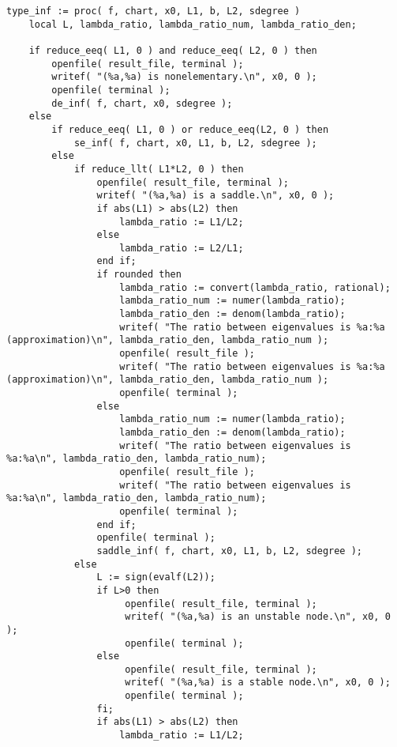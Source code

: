 \documentclass[a4paper,10pt]{article}
\begin{document}
\begin{lstlisting}[name=infinity]
type_inf := proc( f, chart, x0, L1, b, L2, sdegree )
    local L, lambda_ratio, lambda_ratio_num, lambda_ratio_den;

    if reduce_eeq( L1, 0 ) and reduce_eeq( L2, 0 ) then
        openfile( result_file, terminal );
        writef( "(%a,%a) is nonelementary.\n", x0, 0 );
        openfile( terminal );
        de_inf( f, chart, x0, sdegree );
    else
        if reduce_eeq( L1, 0 ) or reduce_eeq(L2, 0 ) then
            se_inf( f, chart, x0, L1, b, L2, sdegree );
        else
            if reduce_llt( L1*L2, 0 ) then
                openfile( result_file, terminal );
                writef( "(%a,%a) is a saddle.\n", x0, 0 );
                if abs(L1) > abs(L2) then
                    lambda_ratio := L1/L2;
                else
                    lambda_ratio := L2/L1;
                end if;
                if rounded then
                    lambda_ratio := convert(lambda_ratio, rational);
                    lambda_ratio_num := numer(lambda_ratio);
                    lambda_ratio_den := denom(lambda_ratio);
                    writef( "The ratio between eigenvalues is %a:%a (approximation)\n", lambda_ratio_den, lambda_ratio_num );
                    openfile( result_file );
                    writef( "The ratio between eigenvalues is %a:%a (approximation)\n", lambda_ratio_den, lambda_ratio_num );
                    openfile( terminal );
                else
                    lambda_ratio_num := numer(lambda_ratio);
                    lambda_ratio_den := denom(lambda_ratio);
                    writef( "The ratio between eigenvalues is %a:%a\n", lambda_ratio_den, lambda_ratio_num);
                    openfile( result_file );
                    writef( "The ratio between eigenvalues is %a:%a\n", lambda_ratio_den, lambda_ratio_num);
                    openfile( terminal );
                end if;
                openfile( terminal );
                saddle_inf( f, chart, x0, L1, b, L2, sdegree );
            else
                L := sign(evalf(L2));
                if L>0 then
                     openfile( result_file, terminal );
                     writef( "(%a,%a) is an unstable node.\n", x0, 0 );
                     openfile( terminal );
                else
                     openfile( result_file, terminal );
                     writef( "(%a,%a) is a stable node.\n", x0, 0 );
                     openfile( terminal );
                fi;
                if abs(L1) > abs(L2) then
                    lambda_ratio := L1/L2;

\end{lstlisting}
\end{document}
